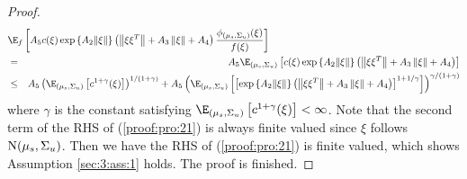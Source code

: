 \begin{proof}
{\footnotesize{
\begin{eqnarray}
\lefteqn{\E_f\left[A_5c(\xi)\exp{\left\{A_2\|\xi\|\right\}}\left(\left\|
\xi\xi^T\right\|+A_3\left\|\xi\right\|+A_4\right)\frac{\phi_{(\mu_s,
\Sigma_u)}(\xi)}{f(\xi)}\right]}\nonumber\\
&=&
A_{5}\E_{(\mu_s,\Sigma_u)}\left[c(\xi)\exp{\left\{A_2\|\xi\|\right\}}\left(\left\|
\xi\xi^T\right\|+A_3\left\|\xi\right\|+A_4\right)\right]\nonumber\\
&\le& A_{5}\left(\E_{(\mu_s,\Sigma_u)}\left[c^{1+\gamma}
(\xi)\right]\right)^{1/(1+\gamma)}+A_{5}\left(\E_{(\mu_s,\Sigma_u)}\left[\left[\exp{\left\{A_2
\|\xi\|\right\}}\left(\left\|\xi\xi^T\right\|+A_3\left\|\xi\right\|
+A_4\right)\right]^{1+1/\gamma}\right]\right)^{\gamma/(1+\gamma)}\label{proof:pro:21}
\end{eqnarray} }}where $\gamma$ is the constant satisfying
$\E_{(\mu_s,\Sigma_u)}\left[c^{1+\gamma}(\xi)\right]<\infty$. Note
that the second term of the RHS of (\ref{proof:pro:21}) is always
finite valued since $\xi$ follows ${\rm N}(\mu_s,\Sigma_u)$. Then we
have the RHS of (\ref{proof:pro:21}) is finite valued, which shows
Assumption \ref{sec:3:ass:1} holds. The proof is finished.
\end{proof}


